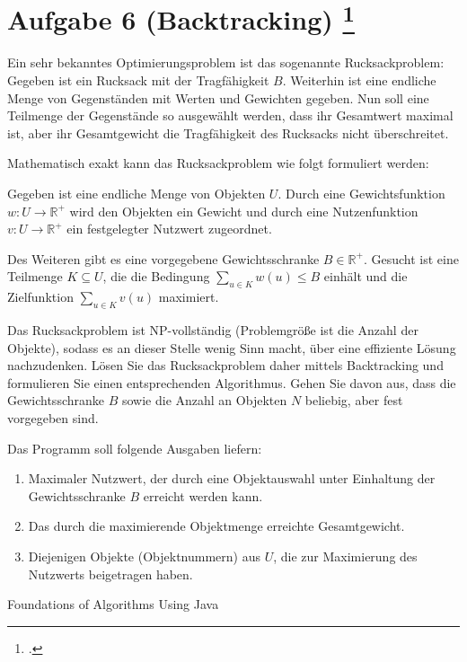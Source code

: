 \documentclass{lehramt-informatik-aufgabe}
\begin{document}

\section{Aufgabe 6 (Backtracking)
\footcite[Thema 2 Aufgabe 6 Seite 10]{examen:66115:2018:09}
}

Ein sehr bekanntes Optimierungsproblem ist das sogenannte
Rucksackproblem: Gegeben ist ein Rucksack mit der Tragfähigkeit $B$.
Weiterhin ist eine endliche Menge von Gegenständen mit Werten und
Gewichten gegeben. Nun soll eine Teilmenge der Gegenstände so ausgewählt
werden, dass ihr Gesamtwert maximal ist, aber ihr Gesamtgewicht die
Tragfähigkeit des Rucksacks nicht überschreitet.

Mathematisch exakt kann das Rucksackproblem wie folgt formuliert werden:

Gegeben ist eine endliche Menge von Objekten $U$. Durch eine
Gewichtsfunktion $w : U \rightarrow \mathbb{R}^+$ wird den Objekten ein
Gewicht und durch eine Nutzenfunktion $v : U \rightarrow \mathbb{R}^+$
ein festgelegter Nutzwert zugeordnet.

Des Weiteren gibt es eine vorgegebene Gewichtsschranke $B \in
\mathbb{R}^+$. Gesucht ist eine Teilmenge $K \subseteq U$, die die
Bedingung $\sum_{u \in K} w(u) \leq B$ einhält und die Zielfunktion
$\sum_{u \in K} v(u)$ maximiert.

Das Rucksackproblem ist NP-vollständig (Problemgröße ist die Anzahl der
Objekte), sodass es an dieser Stelle wenig Sinn macht, über eine
effiziente Lösung nachzudenken. Lösen Sie das Rucksackproblem daher
mittels Backtracking und formulieren Sie einen entsprechenden
Algorithmus. Gehen Sie davon aus, dass die Gewichtsschranke $B$ sowie
die Anzahl an Objekten $N$ beliebig, aber fest vorgegeben sind.

Das Programm soll folgende Ausgaben liefern:

\begin{enumerate}
\item  Maximaler Nutzwert, der durch eine Objektauswahl unter Einhaltung
der Gewichtsschranke $B$ erreicht werden kann.

\item Das durch die maximierende Objektmenge erreichte Gesamtgewicht.

\item Diejenigen Objekte (Objektnummern) aus $U$, die zur Maximierung
des Nutzwerts beigetragen haben.

\end{enumerate}

\begin{liAntwort}
Foundations of Algorithms Using Java
\end{liAntwort}
\end{document}
